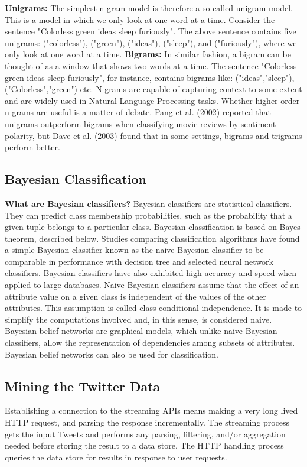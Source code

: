 \documentclass[journal]{IEEEtran}
\begin{document}
\begin{itemize}
	\textbf{Unigrams:} The simplest n-gram model is therefore a so-called unigram model. This is a model in which we only look at one word at a time. Consider the sentence "Colorless green ideas sleep furiously". The above sentence contains five unigrams: ("colorless"), ("green"), ("ideas"), ("sleep"), and ("furiously"), where we only look at one word at a time. \newline 
	\textbf{Bigrams:} In similar fashion, a bigram can be thought of as a window that shows two words at a time. The sentence "Colorless green ideas sleep furiously", for instance, contains bigrams like: ("ideas","sleep"), ("Colorless","green") etc.\newline
	N-grams are capable of capturing context to some extent and are widely used in Natural Language Processing tasks. Whether higher order n-grams are useful is a matter of debate. Pang et al. (2002) reported that unigrams outperform bigrams when classifying movie reviews by sentiment polarity, but Dave et al. (2003) found that in some settings, bigrams and trigrams perform better.
	
\end{itemize}
\subsection{Bayesian Classification}
\noindent 
\textbf{What are Bayesian classifiers?} \newline
Bayesian classifiers are statistical classifiers. They can predict class membership probabilities, such as the probability that a given tuple belongs to a particular class. Bayesian classification is based on Bayes theorem, described below. Studies comparing classification algorithms have found a simple Bayesian classifier known as the naive Bayesian classifier to be comparable in performance with decision tree and selected neural network classifiers. Bayesian classifiers have also exhibited high accuracy and speed when applied to large databases. Naive Bayesian classifiers assume that the effect of an attribute value on a given class is independent of the values of the other attributes. This assumption is called class conditional independence. It is made to simplify the computations involved and, in this sense, is considered naive. Bayesian belief networks are graphical models, which unlike naive Bayesian classifiers, allow the representation of dependencies among subsets of attributes. Bayesian belief networks can also be used for classification.
\noindent
\subsection{Mining the Twitter Data}
Establishing a connection to the streaming APIs means making a very long lived HTTP request, and parsing the response incrementally.
The streaming process gets the input Tweets and performs any parsing, filtering, and/or aggregation needed before storing the result to a data store.
The HTTP handling process queries the data store for results in response to user requests.
\end{document}
